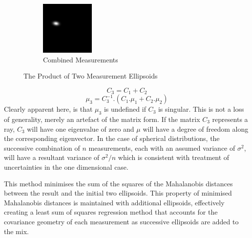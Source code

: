 \documentclass[a4paper, 11pt, titlepage]{article}
\begin{document}
\begin{figure}
      \begin{subfigure}{.3\textwidth}
        \centering
        \includegraphics[width=.8\linewidth]{images/GaussianLine3.png}
        \caption{Combined Measurements}
        \label{fig:uncProdsub3}
      \end{subfigure}
      \caption{The Product of Two Measurement Ellipsoids}
      \label{fig:uncProd}
      \end{figure}

      \begin{equation}
      C_3 = C_1+C_2
      \end{equation}
      \begin{equation}
      \mu_3 = C_3^{-1} . (C_1.\mu_1 + C_2.\mu_2)
      \end{equation}
      Clearly apparent here, is that \(\mu_3\) is undefined if \(C_3\) is singular.
      This is not a loss of generality, merely an artefact of the matrix form.  If the matrix \(C_3\) represents a ray, \(C_3\)  will have one eigenvalue of zero and \(\mu\) will have a degree of freedom along the corresponding eigenvector.
      In the case of spherical distributions, the successive combination of \(n\) measurements, each with an assumed variance of \(\sigma^2\), will have a resultant variance of \(\sigma^2/n\) which is consistent with treatment of uncertainties in the one dimensional case.
      
      This method minimises the sum of the squares of the Mahalanobis distances between the result and the initial two ellipsoids.  This property of minimised Mahalanobis distances is maintained with additional ellipsoids, effectively creating a least sum of squares regression method that accounts for the covariance geometry of each measurement as successive ellipsoids are added to the mix.
\end{document}
